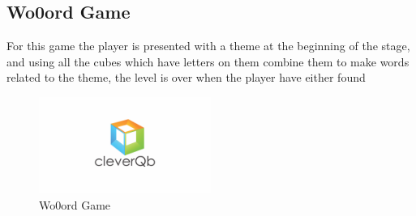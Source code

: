\subsection{Wo0ord Game}
\label{game:wo0ord_game}
For this game the player is presented with a theme at the beginning of the stage, and using all the cubes which have letters on them combine them to make words related to the theme, the level is over when the player have either found 

\begin{figure}
	\includegraphics[width=0.5\textwidth]{images/Costas/cleverQb_300_2.png}
	\caption{Wo0ord Game}
	\label{fig:Costas}
	
\end{figure}

